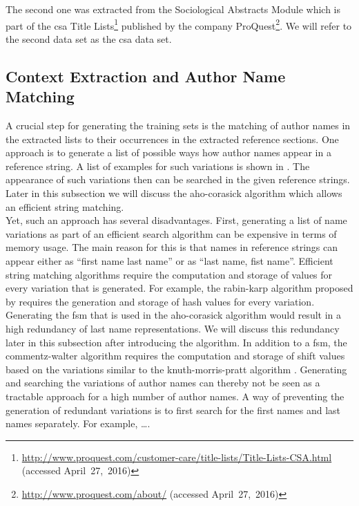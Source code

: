 The second one was extracted from the Sociological Abstracts Module which is part of the \gls{csa} Title Lists\footnote{\url{http://www.proquest.com/customer-care/title-lists/Title-Lists-CSA.html} (accessed April~27,~2016)} published by the company ProQuest\footnote{\url{http://www.proquest.com/about/} (accessed April~27,~2016)}.
We will refer to the second data set as the \gls{csa} data set.


\subsection{Context Extraction and Author Name Matching}
A crucial step for generating the training sets is the matching of author names in the extracted lists to their occurrences in the extracted reference sections.
One approach is to generate a list of possible ways how author names appear in a reference string.
A list of examples for such variations is shown in .
The appearance of such variations then can be searched in the given reference strings.
Later in this subsection we will discuss the \gls{aho-corasick algorithm} which allows an efficient string matching.\\

Yet, such an approach has several disadvantages.
First, generating a list of name variations as part of an efficient search algorithm can be expensive in terms of memory usage.
The main reason for this is that names in reference strings can appear either as ``first name last name'' or as ``last name, fist name''.
Efficient string matching algorithms require the computation and storage of values for every variation that is generated.
For example, the \gls{rabin-karp algorithm} proposed by \citet{karp1987efficient} requires the generation and storage of hash values for every variation.
Generating the \gls{fsm} that is used in the \gls{aho-corasick algorithm} would result in a high redundancy of last name representations.
We will discuss this redundancy later in this subsection after introducing the algorithm.
In addition to a \gls{fsm}, the \gls{commentz-walter algorithm} \citep{commentz1979string} requires the computation and storage of shift values based on the variations similar to the \gls{knuth-morris-pratt algorithm} \citep{knuth1977fast}.
Generating and searching the variations of author names can thereby not be seen as a tractable approach for a high number of author names.
A way of preventing the generation of redundant variations is to first search for the first names and last names separately.
For example, \dots{}.\\

